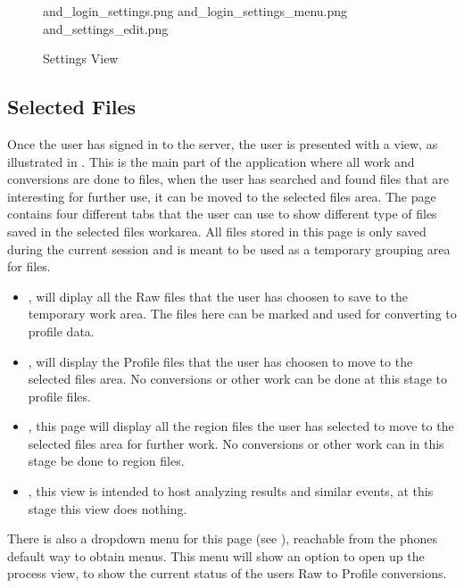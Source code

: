 \begin{figure}[h]
\addThreeImages
{and_login_settings.png}
{and_login_settings_menu.png}
{and_settings_edit.png}
\caption{Settings View}
\label{fig:and_settings_man}
\end{figure}
\FloatBarrier

\subsection{Selected Files}\label{sec:and_manual_selected}
Once the user has signed in to the server, the user is presented with a  view, as illustrated in .
This is the main part of the application where all work and conversions are done to files, when the user has searched and found files that are interesting for further use, it can be moved to the selected files area. 
The page contains four different tabs that the user can use to show different type of files saved in the selected files workarea. All files stored in this page is only saved during the current session and is meant to be used as a temporary grouping area for files. 

\begin{itemize}

	\item {}, will diplay all the Raw files that the user has choosen to save to the temporary work area. The files here can be marked and used for converting to profile data.
    \item {}, will display the Profile files that the user has choosen to move to the selected files area. No conversions or other work can be done at this stage to profile files.
    \item {}, this page will display all the region files the user has selected to move to the selected files area for further work. No conversions or other work can in this stage be done to region files.
    \item {}, this view is intended to host analyzing results and similar events, at this stage this view does nothing.
    
\end{itemize}

There is also a dropdown menu for this page (see ), reachable from the phones default way to obtain menus. This menu will show an option to open up the process view, to show the current status of the users Raw to Profile conversions.


